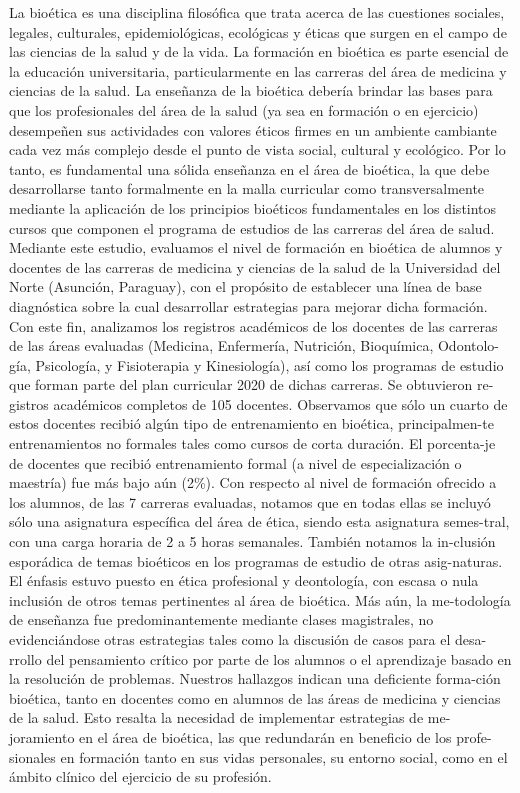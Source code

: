 \documentclass[
]{book}
\begin{document}
La bioética es una disciplina filosófica que trata acerca de las cuestiones sociales, legales, culturales, epidemiológicas, ecológicas y éticas que surgen en el campo de las ciencias de la salud y de la vida. La formación en bioética es parte esencial de la educación universitaria, particularmente en las carreras del área de medicina y ciencias de la salud. La enseñanza de la bioética debería brindar las bases para que los profesionales del área de la salud (ya sea en formación o en ejercicio) desempeñen sus actividades con valores éticos firmes en un ambiente cambiante cada vez más complejo desde el punto de vista social, cultural y ecológico. Por lo tanto, es fundamental una sólida enseñanza en el área de bioética, la que debe desarrollarse tanto formalmente en la malla curricular como transversalmente mediante la aplicación de los principios bioéticos fundamentales en los distintos cursos que componen el programa de estudios de las carreras del área de salud. Mediante este estudio, evaluamos el nivel de formación en bioética de alumnos y docentes de las carreras de medicina y ciencias de la salud de la Universidad del Norte (Asunción, Paraguay), con el propósito de establecer una línea de base diagnóstica sobre la cual desarrollar estrategias para mejorar dicha formación. Con este fin, analizamos los registros académicos de los docentes de las carreras de las áreas evaluadas (Medicina, Enfermería, Nutrición, Bioquímica, Odontolo-gía, Psicología, y Fisioterapia y Kinesiología), así como los programas de estudio que forman parte del plan curricular 2020 de dichas carreras. Se obtuvieron re-gistros académicos completos de 105 docentes. Observamos que sólo un cuarto de estos docentes recibió algún tipo de entrenamiento en bioética, principalmen-te entrenamientos no formales tales como cursos de corta duración. El porcenta-je de docentes que recibió entrenamiento formal (a nivel de especialización o maestría) fue más bajo aún (2\%). Con respecto al nivel de formación ofrecido a los alumnos, de las 7 carreras evaluadas, notamos que en todas ellas se incluyó sólo una asignatura específica del área de ética, siendo esta asignatura semes-tral, con una carga horaria de 2 a 5 horas semanales. También notamos la in-clusión esporádica de temas bioéticos en los programas de estudio de otras asig-naturas. El énfasis estuvo puesto en ética profesional y deontología, con escasa o nula inclusión de otros temas pertinentes al área de bioética. Más aún, la me-todología de enseñanza fue predominantemente mediante clases magistrales, no evidenciándose otras estrategias tales como la discusión de casos para el desa-rrollo del pensamiento crítico por parte de los alumnos o el aprendizaje basado en la resolución de problemas. Nuestros hallazgos indican una deficiente forma-ción bioética, tanto en docentes como en alumnos de las áreas de medicina y ciencias de la salud. Esto resalta la necesidad de implementar estrategias de me-joramiento en el área de bioética, las que redundarán en beneficio de los profe-sionales en formación tanto en sus vidas personales, su entorno social, como en el ámbito clínico del ejercicio de su profesión.
\end{document}
